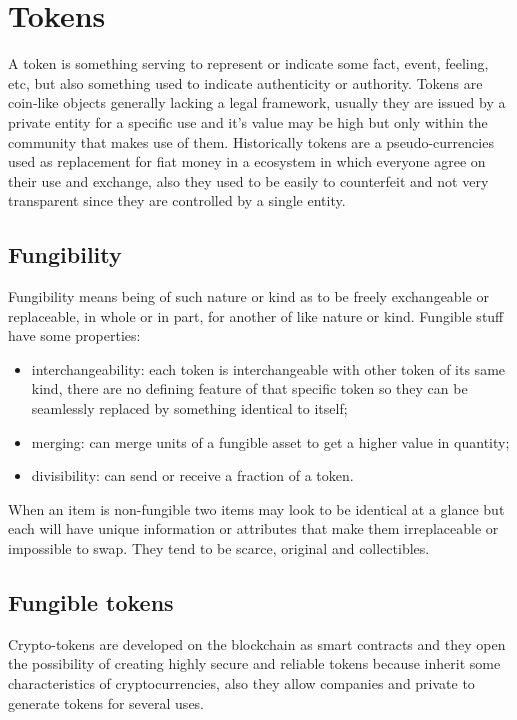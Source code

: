 \section{Tokens}
A token is something serving to represent or indicate some fact, event, feeling, etc, but also something used to indicate authenticity or authority.
Tokens are coin-like objects generally lacking a legal framework, usually they are issued by a private entity for a specific use and it's value may be high but only within the community that makes use of them.
Historically tokens are a pseudo-currencies used as replacement for fiat money in a ecosystem in which everyone agree on their use and exchange, also they used to be easily to counterfeit and not very transparent since they are controlled by a single entity.

\subsection{Fungibility}
Fungibility means being of such nature or kind as to be freely exchangeable or replaceable, in whole or in part, for another of like nature or kind.
Fungible stuff have some properties:
\begin{itemize}
    \item interchangeability: each token is interchangeable with other token of its same kind, there are no defining feature of that specific token so they can be seamlessly replaced by something identical to itself;
    \item merging: can merge units of a fungible asset to get a higher value in quantity;
    \item divisibility: can send or receive a fraction of a token.
\end{itemize}

When an item is non-fungible two items may look to be identical at a glance but each will have unique information or attributes that make them irreplaceable or impossible to swap.
They tend to be scarce, original and collectibles.

\subsection{Fungible tokens}
Crypto-tokens are developed on the blockchain as smart contracts and they open the possibility of creating highly secure and reliable tokens because inherit some characteristics of cryptocurrencies, also they allow companies and private to generate tokens for several uses.

